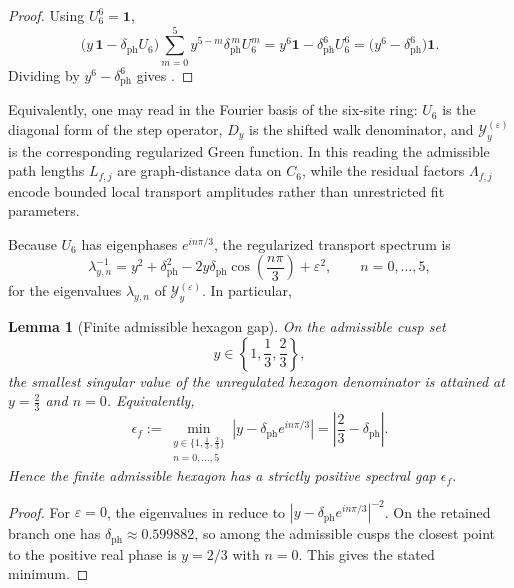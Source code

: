 \documentclass[11pt,a4paper]{article}
\newtheorem{lemma}[theorem]{Lemma}
\theoremstyle{definition}
\theoremstyle{remark}
\begin{document}
\begin{proof}
Using $U_6^6=\mathbf 1$,
\[
\bigl(y\,\mathbf 1-\delta_{\mathrm{ph}}U_6\bigr)
\sum_{m=0}^{5}y^{5-m}\delta_{\mathrm{ph}}^{\,m}U_6^m
=
y^6\mathbf 1-\delta_{\mathrm{ph}}^6U_6^6
=
\bigl(y^6-\delta_{\mathrm{ph}}^6\bigr)\mathbf 1.
\]
Dividing by $y^6-\delta_{\mathrm{ph}}^6$ gives .
\end{proof}

Equivalently, one may read  in the Fourier basis of the six-site ring: $U_6$ is the diagonal form of the step operator, $D_y$ is the shifted walk denominator, and $\mathcal Y_y^{(\varepsilon)}$ is the corresponding regularized Green function. In this reading the admissible path lengths $L_{f,j}$ are graph-distance data on $C_6$, while the residual factors $\Lambda_{f,j}$ encode bounded local transport amplitudes rather than unrestricted fit parameters.

Because $U_6$ has eigenphases $e^{in\pi/3}$, the regularized transport spectrum is
\begin{equation}
\label{eq:transport-spectrum}
\lambda_{y,n}^{-1}
=
y^2+\delta_{\mathrm{ph}}^2-2y\delta_{\mathrm{ph}}\cos\!\left(\frac{n\pi}{3}\right)+\varepsilon^2,
\qquad
n=0,\dots,5,
\end{equation}
for the eigenvalues $\lambda_{y,n}$ of $\mathcal Y_y^{(\varepsilon)}$. In particular,
\begin{lemma}[Finite admissible hexagon gap]
\label{lem:finite-admissible-hexagon-gap}
On the admissible cusp set
\[
y\in\left\{1,\frac13,\frac23\right\},
\]
the smallest singular value of the unregulated hexagon denominator is attained at $y=\frac23$ and $n=0$. Equivalently,
\[
\epsilon_f
:=
\min_{\substack{y\in\{1,\frac13,\frac23\}\\ n=0,\dots,5}}
\left|y-\delta_{\mathrm{ph}}e^{in\pi/3}\right|
=
\left|\frac23-\delta_{\mathrm{ph}}\right|.
\]
Hence the finite admissible hexagon has a strictly positive spectral gap $\epsilon_f$.
\end{lemma}

\begin{proof}
For $\varepsilon=0$, the eigenvalues in  reduce to $|y-\delta_{\mathrm{ph}}e^{in\pi/3}|^{-2}$. On the retained branch one has $\delta_{\mathrm{ph}}\approx \num{0.599882}$, so among the admissible cusps the closest point to the positive real phase is $y=2/3$ with $n=0$. This gives the stated minimum.
\end{proof}
\end{document}
